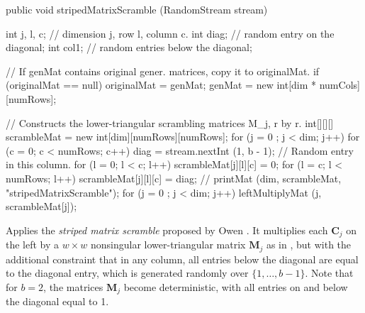 \begin{code}

   public void stripedMatrixScramble (RandomStream stream)\begin{hide} {
      int j, l, c;  // dimension j, row l, column c.
      int diag;     // random entry on the diagonal;
      int col1;     // random entries below the diagonal;

      // If genMat contains original gener. matrices, copy it to originalMat.
      if (originalMat == null) {
         originalMat = genMat;
         genMat = new int[dim * numCols][numRows];
      }

      // Constructs the lower-triangular scrambling matrices M_j, r by r.
      int[][][] scrambleMat = new int[dim][numRows][numRows];
      for (j = 0 ; j < dim; j++) {
         for (c = 0; c < numRows; c++) {
            diag = stream.nextInt (1, b - 1);   // Random entry in this column.
            for (l = 0; l < c; l++)         scrambleMat[j][l][c] = 0;
            for (l = c; l < numRows; l++) scrambleMat[j][l][c] = diag;
         }
      }
      // printMat (dim, scrambleMat,  "stripedMatrixScramble");
      for (j = 0 ; j < dim; j++) leftMultiplyMat (j, scrambleMat[j]);
   }\end{hide}
\end{code}
 \begin{tabb}
   Applies the \emph{striped matrix scramble} proposed by Owen \cite{vOWE03a}.
   It multiplies each $\mathbf{C}_j$ on the left
   by a $w\times w$ nonsingular lower-triangular matrix $\mathbf{M}_j$ as in
   , but with the additional constraint that
   in any column, all entries below the diagonal are equal to the
   diagonal entry, which is generated randomly over $\{1,\dots,b-1\}$.
   Note that for $b=2$, the matrices $\mathbf{M}_j$ become deterministic, with
   all entries on and below the diagonal equal to 1.
\end{tabb}
\begin{htmlonly}
\end{htmlonly}
